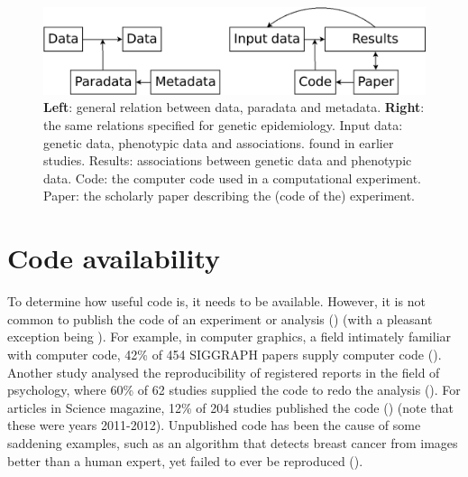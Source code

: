 \begin{figure}[!htbp]
  \centering
  \includegraphics[width=\linewidth]{figure_1.png}
  \caption{
    \textbf{Left}: general relation between data, paradata and metadata.
    \textbf{Right}: the same relations specified for genetic epidemiology.
    Input data: genetic data, phenotypic data and associations.
    found in earlier studies.
    Results: associations between genetic data and phenotypic data.
    Code: the computer code used in a computational experiment.
    Paper: the scholarly paper describing the (code of the) experiment.
  }
  \label{fig:figure_1}
\end{figure}

\section{Code availability}\label{sec:code-availability}

To determine how useful code is, it needs to be available.
However, it is not common to publish the code of an experiment or analysis 
(\cite{stodden2011trust,read2015sizing}) (with a pleasant exception 
being \cite{conesa2019making}).
For example, in computer graphics, 
a field intimately familiar with computer code,
42\% of 454 SIGGRAPH papers supply computer code (\cite{bonneel2020code}).
Another study analysed the reproducibility of registered reports
in the field of psychology, 
where 60\% of 62 studies supplied the code 
to redo the analysis (\cite{obels2020analysis}).
For articles in Science magazine, 12\% of 204
studies published the code (\cite{stodden2018empirical}) 
(note that these were years 2011-2012).
Unpublished code has been the cause of some saddening examples,
such as an algorithm that detects breast cancer from images 
better than a human expert, 
yet failed to ever be reproduced (\cite{haibe2020importance}).


